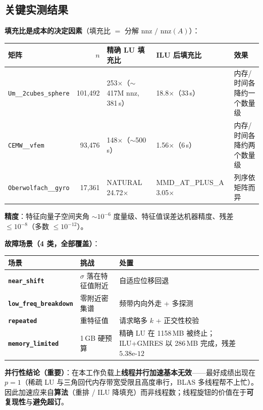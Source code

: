 \documentclass[11pt,a4paper]{ctexart}
\newcommand{\code}[1]{\texttt{\small #1}}
\begin{document}
\subsection{关键实测结果}

\textbf{填充比是成本的决定因素}（填充比 $=$ 分解 nnz $/$ nnz$(A)$）：

\begin{table}[h]
\centering\small
\renewcommand{\arraystretch}{1.3}
\begin{tabular}{@{}l r l l p{4.2cm}@{}}
\toprule
矩阵 & $n$ & 精确 LU 填充比 & ILU 后填充比 & 效果 \\
\midrule
\code{Um\_\_2cubes\_sphere} & 101,492 & 253$\times$（$\sim$417M nnz, 381\,s） & 18.8$\times$（33\,s） & 内存/时间各降约一个数量级 \\
\code{CEMW\_\_vfem} & 93,476 & 148$\times$（$\sim$500\,s） & 1.56$\times$（6\,s） & 内存/时间各降约两个数量级 \\
\code{Oberwolfach\_\_gyro} & 17,361 & NATURAL 24.72$\times$ & MMD\_AT\_PLUS\_A 3.05$\times$ & 列序依矩阵而异 \\
\bottomrule
\end{tabular}
\end{table}

\textbf{精度}：特征向量子空间夹角 $\sim 10^{-6}$ 度量级、特征值误差达机器精度、残差 $\le 10^{-8}$（多数 $\le 10^{-12}$）。

\textbf{故障场景（4 类，全部覆盖）}：

\begin{table}[h]
\centering\small
\renewcommand{\arraystretch}{1.3}
\begin{tabularx}{\textwidth}{@{}>{\bfseries}p{3.6cm} X p{5.6cm}@{}}
\toprule
场景 & 挑战 & 处置 \\
\midrule
\code{near\_shift} & $\sigma$ 落在特征值附近 & 自适应位移回退 \\
\code{low\_freq\_breakdown} & 零附近密集谱 & 频带内向外走 + 多探测 \\
\code{repeated} & 重特征值 & 请求略多 $k$ + 正交性校验 \\
\code{memory\_limited} & 1\,GB 硬预算 & 精确 LU 在 1158\,MB 被终止；ILU+GMRES 以 286\,MB 完成，残差 $5.38\text{e-}12$ \\
\bottomrule
\end{tabularx}
\end{table}

\textbf{并行性结论（重要）}：在本工作负载上\textbf{线程并行加速基本无效}——最好成绩出现在 $p=1$（稀疏 LU 与三角回代内存带宽受限且高度串行，BLAS 多线程帮不上忙）。因此加速应来自\textbf{算法}（重排 / ILU 降填充）而非线程数；线程旋钮的价值在于\textbf{可复现性}与\textbf{避免超订}。
\end{document}

